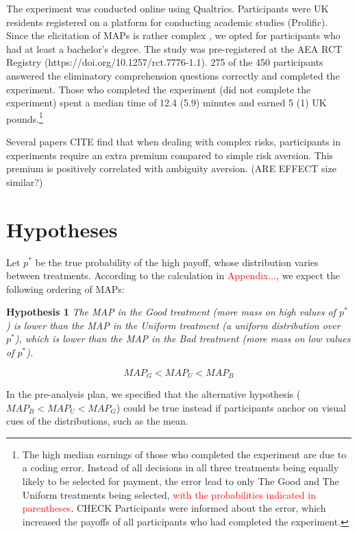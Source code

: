 The experiment was conducted online using Qualtrics.
Participants were UK residents registered on a platform for conducting academic studies (Prolific).
Since the elicitation of MAPs is rather complex \citep{Quercia2016,Polipciuc2020}, we opted for participants who had at least a bachelor's degree.
The study was pre-registered at the AEA RCT Registry (https://doi.org/10.1257/rct.7776-1.1).
275 of the 450 participants answered the eliminatory comprehension questions correctly and completed the experiment.
Those who completed the experiment (did not complete the experiment) spent a median time of 12.4 (5.9) minutes and earned 5 (1) UK pounds.\footnote{
The high median earnings of those who completed the experiment are due to a coding error.
Instead of all decisions in all three treatments being equally likely to be selected for payment, the error lead to only The Good and The Uniform treatments being selected, \textcolor{red}{with the probabilities indicated in parentheses}. CHECK
Participants were informed about the error, which increased the payoffs of all participants who had completed the experiment.
}




Several papers CITE find that when dealing with complex risks, participants in experiments require an extra premium compared to simple risk aversion.
This premium is positively correlated with ambiguity aversion. (ARE EFFECT size similar?)


\section{Hypotheses}\label{sec:hyp}
Let $p^*$ be the true probability of the high payoff, whose distribution varies between treatments.
According to the calculation in \textcolor{red}{Appendix...}, we expect the following ordering of MAPs:

\noindent \textbf{Hypothesis 1} \quad \textit{The MAP in the Good treatment (more mass on high values of $p^*$) is lower than the MAP in the Uniform treatment (a uniform distribution over $p^*$), which is lower than the MAP in the Bad treatment (more mass on low values of $p^*$).}

\begin{equation}
MAP_G < MAP_U < MAP_B
\end{equation}

In the pre-analysis plan, we specified that the alternative hypothesis ($MAP_B < MAP_U < MAP_G$) could be true instead if participants anchor on visual cues of the distributions, such as the mean.

